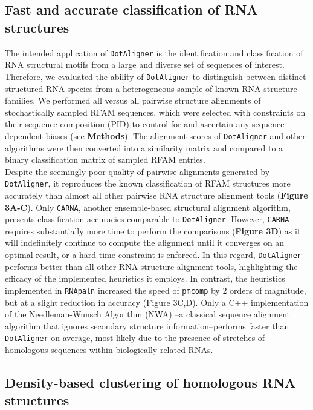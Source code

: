 \documentclass{bmcart}
\newcommand\dotaligner{\texttt{DotAligner}}
\newcommand\carna{\texttt{CARNA}}
\begin{document}
\subsection*{Fast and accurate classification of RNA structures} 

The intended application of \dotaligner{}  is the identification and
classification of RNA structural motifs from a large and diverse set of sequences of interest. 
Therefore, we evaluated the ability of \dotaligner{} to distinguish between distinct structured 
RNA species from a heterogeneous sample of known RNA structure families. 
We performed all versus all pairwise structure alignments of stochastically sampled RFAM sequences, 
which were selected with constraints on their sequence composition (PID) to 
control for and ascertain any sequence-dependent biases (see \textbf{Methods}). The alignment scores 
of \dotaligner{} and other algorithms were then converted into a similarity matrix and 
compared to a binary classification matrix of sampled RFAM entries. \\

Despite the seemingly poor quality of pairwise alignments generated by \dotaligner{}, it 
reproduces the known classification of RFAM structures more accurately than almost all 
other pairwise RNA structure alignment tools (\textbf{Figure 3A-C}). Only \carna{}, 
another ensemble-based structural alignment algorithm, presents classification accuracies
comparable to \dotaligner{}. However,  \carna{} requires substantially more time to perform 
the comparisons (\textbf{Figure 3D}) as it will indefinitely continue to compute the alignment
until it converges on an optimal result, or a hard time constraint is enforced.  In this regard, 
\dotaligner{} performs better than all other RNA structure alignment tools, highlighting 
the efficacy of the implemented  heuristics it employs. In contrast, the heuristics implemented 
in \texttt{RNApaln} increased the speed of \texttt{pmcomp} by 2 orders of magnitude, but
at a slight reduction in accuracy (Figure 3C,D). Only a C++ implementation of the 
Needleman-Wunsch Algorithm (NWA) \cite{needleman1970general}--a classical 
sequence alignment algorithm that ignores secondary structure information--performs 
faster than \dotaligner{} on average, most likely due to the presence of stretches of 
homologous sequences within biologically related RNAs.  \\

\subsection*{Density-based clustering of homologous RNA structures}
\end{document}
